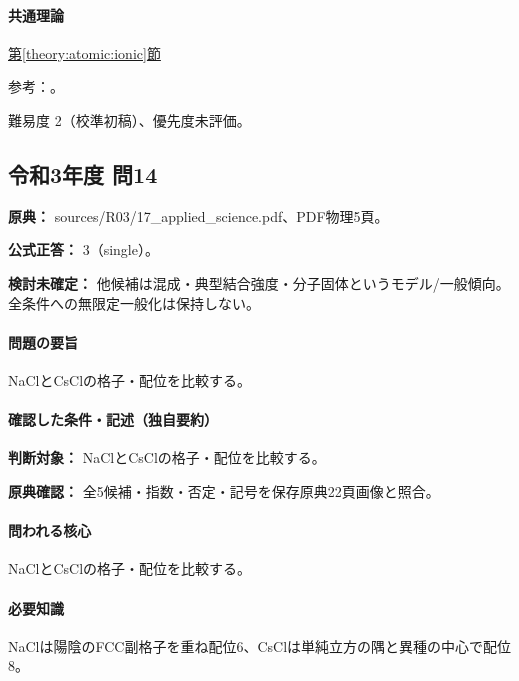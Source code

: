 \paragraph{共通理論} \hyperref[theory:atomic:ionic]{第\ref*{theory:atomic:ionic}節}

\par 参考：\cite{openstax_crystals}。

\par 難易度 2（校準初稿）、優先度未評価。

\subsection{令和3年度 問14}
\label{q:r03-reg-applied-14}

\noindent\textbf{原典：} sources/R03/17\_applied\_science.pdf、PDF物理5頁。

\textbf{公式正答：} 3（single）。

\par\textbf{検討未確定：} 他候補は混成・典型結合強度・分子固体というモデル/一般傾向。全条件への無限定一般化は保持しない。

\paragraph{問題の要旨} NaClとCsClの格子・配位を比較する。

\paragraph{確認した条件・記述（独自要約）}\mbox{}\par

\noindent\textbf{判断対象：} NaClとCsClの格子・配位を比較する。\par

\noindent\textbf{原典確認：} 全5候補・指数・否定・記号を保存原典22頁画像と照合。\par

\paragraph{問われる核心} NaClとCsClの格子・配位を比較する。

\paragraph{必要知識} NaClは陽陰のFCC副格子を重ね配位6、CsClは単純立方の隅と異種の中心で配位8。


